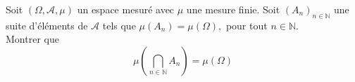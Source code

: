 \documentclass[11pt, addpoints,answers]{exam}
\begin{document}
\begin{questions}
\question[2]


			
Soit $(\Omega, \mathcal{A},\mu)$ un espace mesuré avec $\mu$ une mesure finie. Soit $(A_n)_{n\in\mathbb{N}}$ une suite d'éléments de $\mathcal{A}$ tels que $\mu(A_n) = \mu(\Omega),$ pour tout $n\in\mathbb{N}$.\\

		Montrer que 
		$$
		\mu\left(\bigcap_{n\in\mathbb{N}}A_n\right) = \mu(\Omega)
		$$


\end{questions}
\end{document}
